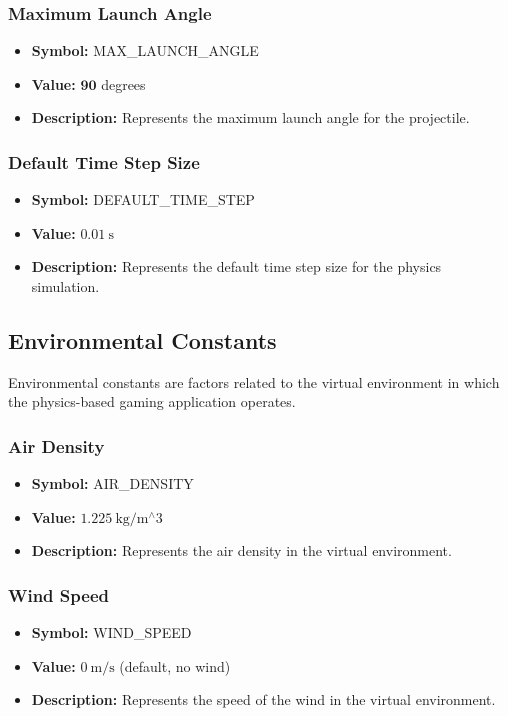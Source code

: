 \documentclass[12pt, titlepage]{article}
\begin{document}
\subsubsection{Maximum Launch Angle}
\begin{itemize}
  \item \textbf{Symbol:} MAX\_LAUNCH\_ANGLE
  \item \textbf{Value:} $\mathbf{9 0}$ degrees
  \item \textbf{Description:} Represents the maximum launch angle for the projectile.
\end{itemize}

\subsubsection{Default Time Step Size}
\begin{itemize}
  \item \textbf{Symbol:} DEFAULT\_TIME\_STEP
  \item \textbf{Value:} $0.01 \mathrm{~s}$
  \item \textbf{Description:} Represents the default time step size for the physics simulation.
\end{itemize}

\subsection{Environmental Constants}
Environmental constants are factors related to the virtual environment in which the physics-based gaming application operates.

\subsubsection{Air Density}
\begin{itemize}
  \item \textbf{Symbol:} AIR\_DENSITY
  \item \textbf{Value:} $1.225 \mathrm{~kg} / \mathrm{m}^{\wedge} 3$
  \item \textbf{Description:} Represents the air density in the virtual environment.
\end{itemize}

\subsubsection{Wind Speed}
\begin{itemize}
  \item \textbf{Symbol:} WIND\_SPEED
  \item \textbf{Value:} $0 \mathrm{~m} / \mathrm{s}$ (default, no wind)
  \item \textbf{Description:} Represents the speed of the wind in the virtual environment.
\end{itemize}
\end{document}
